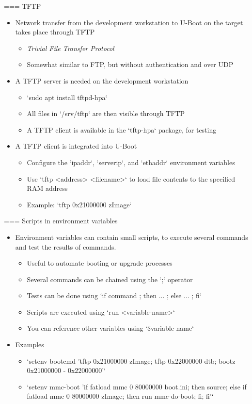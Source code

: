=== {TFTP}
  \begin{itemize}
  \item Network transfer from the development workstation to U-Boot
    on the target takes place through TFTP
    \begin{itemize}
    \item {\em Trivial File Transfer Protocol}
    \item Somewhat similar to FTP, but without authentication and over
      UDP
    \end{itemize}
  \item A TFTP server is needed on the development workstation
    \begin{itemize}
    \item `sudo apt install tftpd-hpa`
    \item All files in `/srv/tftp` are then visible through TFTP
    \item A TFTP client is available in the `tftp-hpa` package,
      for testing
    \end{itemize}
  \item A TFTP client is integrated into U-Boot
    \begin{itemize}
    \item Configure the `ipaddr`, `serverip`, and
      `ethaddr` environment variables
    \item Use `tftp <address> <filename>` to load file contents to
      the specified RAM address
    \item Example: `tftp 0x21000000 zImage`
    \end{itemize}
  \end{itemize}


=== {Scripts in environment variables}
  \begin{itemize}
  \item Environment variables can contain small scripts, to execute
    several commands and test the results of commands.
    \begin{itemize}
    \item Useful to automate booting or upgrade processes
    \item Several commands can be chained using the `;` operator
    \item Tests can be done using
      `if command ; then ... ; else ... ; fi`
    \item Scripts are executed using `run <variable-name>`
    \item You can reference other variables using
      `\${variable-name`}
    \end{itemize}
  \item Examples
    \begin{itemize}
    \item `setenv bootcmd 'tftp 0x21000000 zImage; tftp 0x22000000 dtb; bootz 0x21000000 - 0x22000000'`
    \item `setenv mmc-boot 'if fatload mmc 0 80000000
      boot.ini; then source; else if fatload mmc 0 80000000 zImage;
      then run mmc-do-boot; fi; fi'`
  \end{itemize}
\end{itemize}


